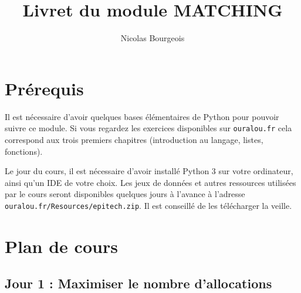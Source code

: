\documentclass[a4paper,11pt]{article}
\author{Nicolas Bourgeois}
\date{}
\title{Livret du module MATCHING}
\begin{document}
\maketitle

\section{Prérequis}

Il est nécessaire d'avoir quelques bases élémentaires de Python pour pouvoir suivre ce module. Si vous regardez les exercices disponibles sur \texttt{ouralou.fr} cela correspond aux trois premiers chapitres (introduction au langage, listes, fonctions).

Le jour du cours, il est nécessaire d'avoir installé Python 3 sur votre ordinateur, ainsi qu'un IDE de votre choix. Les jeux de données et autres ressources utilisées par le cours seront disponibles quelques jours à l'avance à l'adresse \texttt{ouralou.fr/Resources/epitech.zip}. Il est conseillé de les télécharger la veille.

\section{Plan de cours}

\subsection*{Jour 1 : Maximiser le nombre d'allocations}
\end{document}

